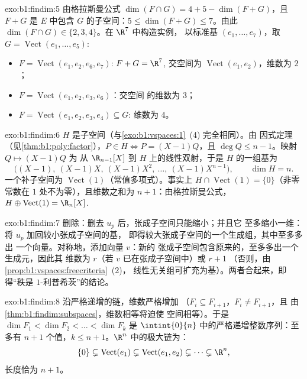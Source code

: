 \begin{solution}{exo:b1:findim:5}
由格拉斯曼公式 $\dim(F \cap G) = 4 + 5 - \dim(F + G)$，且 $F + G$ 是
$E$ 中包含 $G$ 的子空间：$5 \leq \dim(F+G) \leq 7$。由此
$\dim(F \cap G) \in \{2, 3, 4\}$。在 $\R^7$ 中构造实例，
以标准基 $(e_1, \dots, e_7)$，取 $G =
\operatorname{Vect}(e_1, \dots, e_5)$:
\begin{itemize}
  \item $F = \operatorname{Vect}(e_1, e_2, e_6, e_7)$: $F + G = \R^7$,
        交空间为 $\operatorname{Vect}(e_1, e_2)$，维数为 $2$；
  \item $F = \operatorname{Vect}(e_1, e_2, e_3, e_6)$：交空间
        的维数为 $3$；
  \item $F = \operatorname{Vect}(e_1, e_2, e_3, e_4) \subseteq G$:
        维数为 $4$。
\end{itemize}
\end{solution}

\begin{solution}{exo:b1:findim:6}
$H$ 是子空间（与\cref{exo:b1:vspaces:1}~(4) 完全相同）。由
因式定理（见\cref{thm:b1:poly:factor}），$P \in H \iff P =
(X-1)Q$，且 $\deg Q \leq n - 1$。映射 $Q \mapsto (X-1)Q$ 为
从 $\R_{n-1}[X]$ 到 $H$ 上的线性双射，于是 $H$ 的一组基为
\[
\bigl((X-1),\ (X-1)X,\ (X-1)X^2,\ \dots,\ (X-1)X^{n-1}\bigr),
\qquad \dim H = n .
\]
一个补子空间为 $\operatorname{Vect}(1)$（常值多项式）。事实上
$H \cap \operatorname{Vect}(1) = \{0\}$（非零常数在
$1$ 处不为零），且维数之和为 $n + 1$：由格拉斯曼公式，$H
\oplus \operatorname{Vect}(1) = \R_n[X]$.
\end{solution}

\begin{solution}{exo:b1:findim:7}
删除：删去 $u_p$ 后，张成子空间只能缩小；并且它
至多缩小一维：将 $u_p$ 加回较小张成子空间的基，
即得较大张成子空间的一个生成组，其中至多多出
一个向量。对称地，添加向量 $v$：新的
张成子空间包含原来的，至多多出一个生成元，因此其
维数为 $r$（若 $v$ 已在张成子空间中）或 $r + 1$
（否则，由\cref{prop:b1:vspaces:freecriteria}~(2)，
线性无关组可扩充为基）。两者合起来，即得“秩是
$1$-利普希茨”的结论。
\end{solution}

\begin{solution}{exo:b1:findim:8}
沿严格递增的链，维数严格增加
（$F_i \subseteq F_{i+1}$，$F_i \neq F_{i+1}$，且
由\cref{thm:b1:findim:subspaces}，维数相等将迫使
空间相等）。于是 $\dim F_1 < \dim F_2 < \dots < \dim F_k$ 是
$\intint{0}{n}$ 中的严格递增整数序列：至多有
$n + 1$ 个值，$k \leq n + 1$。$\R^n$ 中的极大链为：
\[
\{0\} \subsetneq \operatorname{Vect}(e_1) \subsetneq
\operatorname{Vect}(e_1, e_2) \subsetneq \dots \subsetneq \R^n ,
\]
长度恰为 $n + 1$。
\end{solution}

